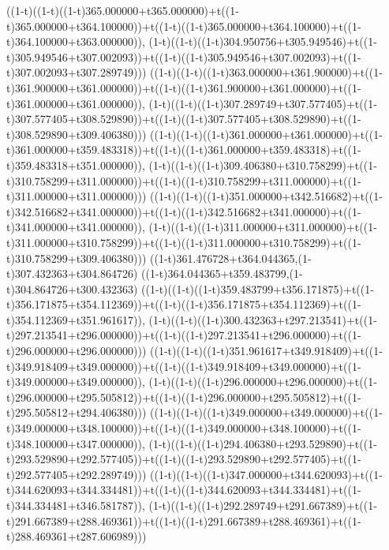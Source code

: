 ((1-t)((1-t)((1-t)365.000000+t365.000000)+t((1-t)365.000000+t364.100000))+t((1-t)((1-t)365.000000+t364.100000)+t((1-t)364.100000+t363.000000)),                                     (1-t)((1-t)((1-t)304.950756+t305.949546)+t((1-t)305.949546+t307.002093))+t((1-t)((1-t)305.949546+t307.002093)+t((1-t)307.002093+t307.289749)))
((1-t)((1-t)((1-t)363.000000+t361.900000)+t((1-t)361.900000+t361.000000))+t((1-t)((1-t)361.900000+t361.000000)+t((1-t)361.000000+t361.000000)),                                     (1-t)((1-t)((1-t)307.289749+t307.577405)+t((1-t)307.577405+t308.529890))+t((1-t)((1-t)307.577405+t308.529890)+t((1-t)308.529890+t309.406380)))
((1-t)((1-t)((1-t)361.000000+t361.000000)+t((1-t)361.000000+t359.483318))+t((1-t)((1-t)361.000000+t359.483318)+t((1-t)359.483318+t351.000000)),                                     (1-t)((1-t)((1-t)309.406380+t310.758299)+t((1-t)310.758299+t311.000000))+t((1-t)((1-t)310.758299+t311.000000)+t((1-t)311.000000+t311.000000)))
((1-t)((1-t)((1-t)351.000000+t342.516682)+t((1-t)342.516682+t341.000000))+t((1-t)((1-t)342.516682+t341.000000)+t((1-t)341.000000+t341.000000)),                                     (1-t)((1-t)((1-t)311.000000+t311.000000)+t((1-t)311.000000+t310.758299))+t((1-t)((1-t)311.000000+t310.758299)+t((1-t)310.758299+t309.406380)))
((1-t)361.476728+t364.044365,(1-t)307.432363+t304.864726)
((1-t)364.044365+t359.483799,(1-t)304.864726+t300.432363)
((1-t)((1-t)((1-t)359.483799+t356.171875)+t((1-t)356.171875+t354.112369))+t((1-t)((1-t)356.171875+t354.112369)+t((1-t)354.112369+t351.961617)),                                     (1-t)((1-t)((1-t)300.432363+t297.213541)+t((1-t)297.213541+t296.000000))+t((1-t)((1-t)297.213541+t296.000000)+t((1-t)296.000000+t296.000000)))
((1-t)((1-t)((1-t)351.961617+t349.918409)+t((1-t)349.918409+t349.000000))+t((1-t)((1-t)349.918409+t349.000000)+t((1-t)349.000000+t349.000000)),                                     (1-t)((1-t)((1-t)296.000000+t296.000000)+t((1-t)296.000000+t295.505812))+t((1-t)((1-t)296.000000+t295.505812)+t((1-t)295.505812+t294.406380)))
((1-t)((1-t)((1-t)349.000000+t349.000000)+t((1-t)349.000000+t348.100000))+t((1-t)((1-t)349.000000+t348.100000)+t((1-t)348.100000+t347.000000)),                                     (1-t)((1-t)((1-t)294.406380+t293.529890)+t((1-t)293.529890+t292.577405))+t((1-t)((1-t)293.529890+t292.577405)+t((1-t)292.577405+t292.289749)))
((1-t)((1-t)((1-t)347.000000+t344.620093)+t((1-t)344.620093+t344.334481))+t((1-t)((1-t)344.620093+t344.334481)+t((1-t)344.334481+t346.581787)),                                     (1-t)((1-t)((1-t)292.289749+t291.667389)+t((1-t)291.667389+t288.469361))+t((1-t)((1-t)291.667389+t288.469361)+t((1-t)288.469361+t287.606989)))
